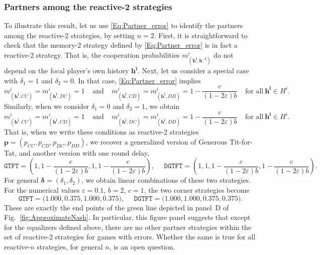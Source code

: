 \documentclass[9pt,twoside,lineno]{pnas-new}
\theoremstyle{plainCl1}
\theoremstyle{plainCl2}
\def\gtft{\texttt{GTFT}}
\def\dgtft{\texttt{DGTFT}}
\begin{document}
\subsubsection*{Partners among the reactive-2 strategies}
To illustrate this result, let us use \eqref{Eq:Partner_error} to identify the partners among the reactive-2 strategies, by setting $n\!=\!2$. 
First, it is straightforward to check that the memory-2 strategy defined by  \eqref{Eq:Partner_error} is in fact a reactive-2 strategy. 
That is, the cooperation probabilities  $m^i_{(\mathbf{h^i},\mathbf{h^{-i}})}$ do not depend on the focal player's own history $\mathbf{h^i}$. 
Next, let us consider a special case with $\delta_1\!=\!1$ and $\delta_2\!=\!0$. In that case, \eqref{Eq:Partner_error} implies 
\begin{equation}
m^i_{(\mathbf{h^i},CC)} = m^i_{(\mathbf{h^i},DC)} =1~~~~~\text{and}~~~~~
m^i_{(\mathbf{h^i},CD)} = m^i_{(\mathbf{h^i},DD)} =1-\frac{c}{(1\!-\!2\varepsilon)b}~~~~~\text{for all}~\mathbf{h^i}\in H^i.
\end{equation}
Similarly, when we consider  $\delta_1\!=\!0$ and $\delta_2\!=\!1$, we obtain 
\begin{equation}
m^i_{(\mathbf{h^i},CC)} = m^i_{(\mathbf{h^i},CD)} =1
~~~~~\text{and}~~~~~
m^i_{(\mathbf{h^i},DC)} = m^i_{(\mathbf{h^i},DD)} =1-\frac{c}{(1\!-\!2\varepsilon)b}~~~~~\text{for all}~\mathbf{h^i}\in H^i.
\end{equation}
That is, when we write these conditions as reactive-2 strategies $\mathbf{p}\!=\!(p_{CC},p_{CD},p_{DC},p_{DD})$, we recover a generalized version of Generous Tit-for-Tat, and another version with one round delay,
\begin{equation}
\gtft=\left( 1, 1\!-\!\frac{c}{(1\!-\!2\varepsilon)b}, 1, 1\!-\!\frac{c}{(1\!-\!2\varepsilon)b} \right), 
~~~~~~
\dgtft= \left( 1, 1, 1\!-\!\frac{c}{(1\!-\!2\varepsilon)b}, 1\!-\!\frac{c}{(1\!-\!2\varepsilon)b} \right).
\end{equation}
For general $\boldsymbol\delta \!=\! (\delta_1,\delta_2)$, we obtain linear combinations of these two strategies. 
For the numerical values $\varepsilon\!=\!0.1$, $b\!=\!2$, $c\!=\!1$, the two corner strategies become
\begin{equation}
\gtft=\big( 1.000, 0.375, 1.000, 0.375 \big), 
~~~~~~
\dgtft= \big( 1.000, 1.000, 0.375, 0.375 \big).
\end{equation}
These are exactly the end points of the green line depicted in panel~D of Fig.~\ref{fig:ApproximateNash}. 
In particular, this figure panel suggests that except for the equalizers defined above, there are no other partner strategies within the set of reactive-2 strategies for games with errors. 
Whether the same is true for all reactive-$n$ strategies, for general $n$, is an open question.\\
\end{document}
